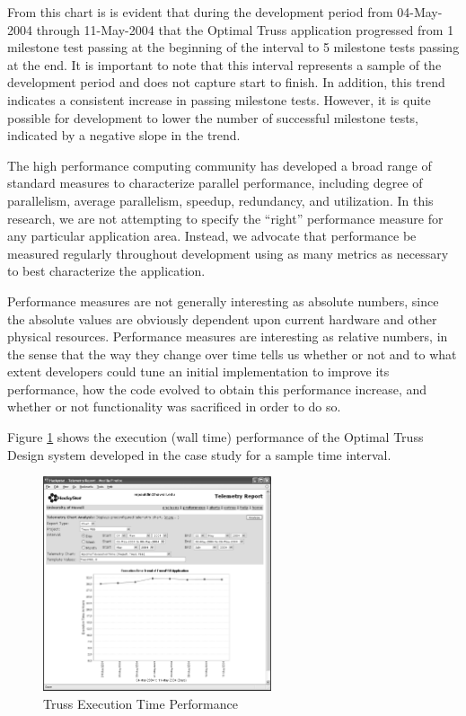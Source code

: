 \documentclass[10pt,twocolumn]{article}
\begin{document}
From this chart is is evident that during the development period from
04-May-2004 through 11-May-2004 that the Optimal Truss application
progressed from 1 milestone test passing at the beginning of the
interval to 5 milestone tests passing at the end.  It is important to
note that this interval represents a sample of the development period
and does not capture start to finish.  In addition, this trend
indicates a consistent increase in passing milestone tests.  However,
it is quite possible for development to lower the number of successful
milestone tests, indicated by a negative slope in the trend.


The high performance computing community has developed a broad range of
standard measures to characterize parallel performance, including degree of
parallelism, average parallelism, speedup, redundancy, and utilization.
In this research, we are not attempting to specify the ``right'' performance
measure for any particular application area. Instead, we advocate that 
performance be measured regularly throughout development using as many metrics
as necessary to best characterize the application. 

Performance measures are not generally interesting as absolute numbers,
since the absolute values are obviously dependent upon current hardware and
other physical resources. Performance measures are interesting as relative
numbers, in the sense that the way they change over time tells us whether
or not and to what extent developers could tune an initial implementation
to improve its performance, how the code evolved to obtain this performance
increase, and whether or not functionality was sacrificed in order to do
so.

Figure \ref{fig:performance} shows the execution (wall time) performance of the 
Optimal Truss Design system developed in the case study for a sample time interval. 

\begin{figure}[htpb]
  \centering
  \includegraphics[width=0.60\textwidth]{truss.performance.eps}
  \caption{Truss Execution Time Performance}
  \label{fig:performance}
\end{figure}
\end{document}
